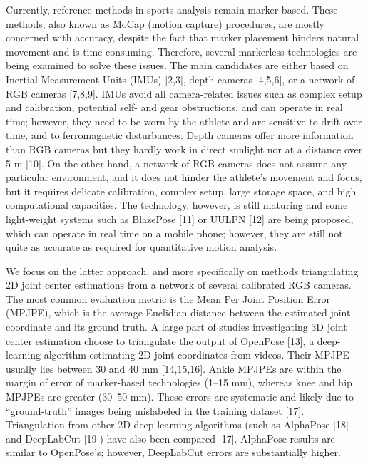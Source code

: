 Currently, reference methods in sports analysis remain marker-based. These methods, also known as MoCap (motion capture) procedures, are mostly concerned with accuracy, despite the fact that marker placement hinders natural movement and is time consuming. Therefore, several markerless technologies are being examined to solve these issues. The main candidates are either based on Inertial Measurement Units (IMUs) [2,3], depth cameras [4,5,6], or a network of RGB cameras [7,8,9]. IMUs avoid all camera-related issues such as complex setup and calibration, potential self- and gear obstructions, and can operate in real time; however, they need to be worn by the athlete and are sensitive to drift over time, and to ferromagnetic disturbances. Depth cameras offer more information than RGB cameras but they hardly work in direct sunlight nor at a distance over 5 m [10]. On the other hand, a network of RGB cameras does not assume any particular environment, and it does not hinder the athlete’s movement and focus, but it requires delicate calibration, complex setup, large storage space, and high computational capacities. The technology, however, is still maturing and some light-weight systems such as BlazePose [11] or UULPN [12] are being proposed, which can operate in real time on a mobile phone; however, they are still not quite as accurate as required for quantitative motion analysis.


We focus on the latter approach, and more specifically on methods triangulating 2D joint center estimations from a network of several calibrated RGB cameras. The most common evaluation metric is the Mean Per Joint Position Error (MPJPE), which is the average Euclidian distance between the estimated joint coordinate and its ground truth. A large part of studies investigating 3D joint center estimation choose to triangulate the output of OpenPose [13], a deep-learning algorithm estimating 2D joint coordinates from videos. Their MPJPE usually lies between 30 and 40 mm [14,15,16]. Ankle MPJPEs are within the margin of error of marker-based technologies (1–15 mm), whereas knee and hip MPJPEs are greater (30–50 mm). These errors are systematic and likely due to “ground-truth” images being mislabeled in the training dataset [17]. Triangulation from other 2D deep-learning algorithms (such as AlphaPose [18] and DeepLabCut [19]) have also been compared [17]. AlphaPose results are similar to OpenPose’s; however, DeepLabCut errors are substantially higher.

